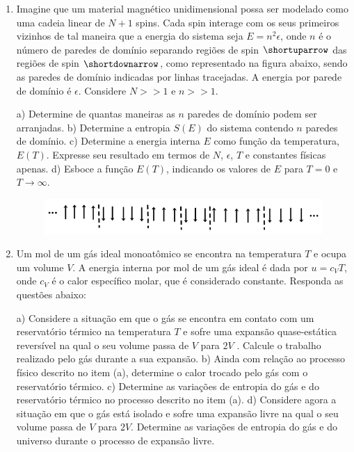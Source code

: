 \begin{enumerate}[start=1,label={\bfseries Q\arabic*.}]
\item Imagine que um material magnético unidimensional possa ser modelado como uma cadeia linear de $N + 1$ spins. Cada spin interage com os seus primeiros vizinhos de tal maneira que a energia do sistema seja $E = n^{2} \epsilon$, onde $n$ é o número de paredes de domínio separando regiões de spin $\shortuparrow$ das regiões de spin $\shortdownarrow$, como representado na figura abaixo, sendo as paredes de domínio indicadas por linhas tracejadas. A energia por parede de domínio é $\epsilon$. Considere $N >> 1$ e $n >> 1$.

a) Determine de quantas maneiras as $n$ paredes de domínio podem ser arranjadas.
b) Determine a entropia $S(E)$ do sistema contendo $n$ paredes de domínio.
c) Determine a energia interna $E$ como função da temperatura, $E(T)$. Expresse seu resultado em termos de $N$, $\epsilon$, $T$ e constantes físicas apenas.
d) Esboce a função $E(T)$, indicando os valores de $E$ para $T = 0$ e $T \rightarrow \infty$.

\begin{figure}[H]
  \centering
  \includegraphics[scale=0.8]{termica-img/spin.png}
\end{figure}



\item Um mol de um gás ideal monoatômico se encontra na temperatura $T$ e ocupa um volume $V$. A energia interna por mol de um gás ideal é dada por $u = c_{V} T$, onde $c_{V}$ é o calor específico molar, que é considerado constante. Responda as questões abaixo:

a) Considere a situação em que o gás se encontra em contato com um reservatório térmico na temperatura $T$ e sofre uma expansão quase-estática reversível na qual o seu volume passa de $V$ para $2V$ . Calcule o trabalho realizado pelo gás durante a sua expansão.
b) Ainda com relação ao processo físico descrito no item (a), determine o calor trocado pelo gás com o reservatório térmico.
c) Determine as variações de entropia do gás e do reservatório térmico no processo descrito no item (a).
d) Considere agora a situação em que o gás está isolado e sofre uma expansão livre na qual o seu volume passa de $V$ para $2V$. Determine as variações de entropia do gás e do universo durante o processo de expansão livre.





\end{enumerate}
